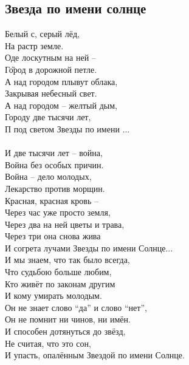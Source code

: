 \documentclass[fleqn,a5paper,12pt,twoside]{guitartabs}
\begin{document}
\subsection*{Звезда по имени солнце}
    Белый с, серый лёд,    \\    
    На растр земле.   \\
    Оде лоскутным на ней -- \\
    Г\G{ород} в дорожной петле.   \\ 
    А над городом плывут облака,     \\   
    Закрывая небесный свет.   \\
    А над городом -- желтый дым, \\
    Городу две тысячи лет, \\
    П под светом Звезды по имени ...   \\ 
    \\
    \-\hspace{3mm}И две тысячи лет -- война,  \\
    \-\hspace{3mm}Война без особых причин. \\
    \-\hspace{3mm}Война -- дело молодых,\\
    \-\hspace{3mm}Лекарство против морщин. \\
    \-\hspace{3mm}Красная, красная кровь -- \\
    \-\hspace{3mm}Через час уже просто земля, \\
    \-\hspace{3mm}Через два на ней цветы и трава, \\
    \-\hspace{3mm}Через три она снова жива \\
    \-\hspace{3mm}И согрета лучами Звезды по имени Солнце... \\
    
    И мы знаем, что так было всегда,    \\
    Что судьбою больше любим,\\
    Кто живёт по законам другим \\
    И кому умирать молодым.   \\
    Он не знает слово ``да'' и слово ``нет'',\\     
    Он не помнит ни чинов, ни имён.  \\
    И способен дотянуться до звёзд, \\
    Не считая, что это сон, \\
    И упасть, опалённым Звездой по имени Солнце.\\
\newpage
{}%
\end{document}
